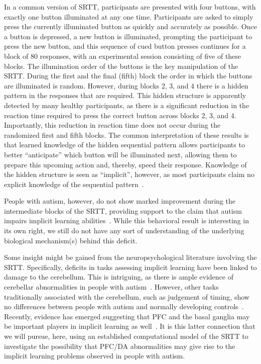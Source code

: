 In a common version of SRTT, participants are presented with four buttons, with exactly one button illuminated at any one time.  Participants are asked to simply press the currently illuminated button as quickly and accurately as possible.  Once a button is depressed, a new button is illuminated, prompting the participant to press the new button, and this sequence of cued button presses continues for a block of 80 responses, with an experimental session consisting of five of these blocks.  The illumination order of the buttons is the key manipulation of the SRTT.  During the first and the final (fifth) block the order in which the buttons are illuminated is random.  However, during blocks 2, 3, and 4 there is a hidden pattern in the responses that are required.  This hidden structure is apparently detected by many healthy participants, as there is a significant reduction in the reaction time required to press the correct button across blocks 2, 3, and 4.  Importantly, this reduction in reaction time does not occur during the randomized first and fifth blocks.  The common interpretation of these results is that learned knowledge of the hidden sequential pattern allows participants to better ``anticipate'' which button will be illuminated next, allowing them to prepare this upcoming action and, thereby, speed their response.  Knowledge of the hidden structure is seen as ``implicit'', however, as most participants claim no explicit knowledge of the sequential pattern~\cite{Cleeremans:1991:SSRT}.

People with autism, however, do not show marked improvement during the intermediate blocks of the SRTT, providing support to the claim that autism impairs implicit learning abilities~\cite{RefWorks:148}.  While this behavioral result is interesting in its own right, we still do not have any sort of understanding of the underlying biological mechanism(s) behind this deficit.

Some insight might be gained from the neuropsychological literature involving the SRTT.  Specifically, deficits in tasks assessing implicit learning have been linked to damage to the cerebellum.  This is intriguing, as there is ample evidence of cerebellar abnormalities in people with autism~\cite{CourchesneE:1994:CerebellumAttentionShift}.  However, other tasks traditionally associated with the cerebellum, such as judgement of timing, show no differences between people with autism and normally developing controls~\cite{RefWorks:148}.  Recently, evidence has emerged suggesting that PFC and the basal ganglia may be important players in implicit learning as well~\cite{RefWorks:109,PascualLeone:2004:PFC_Implicit}.  It is this latter connection that we will pursue, here, using an established computational model of the SRTT to investigate the possibility that PFC/DA abnormalities may give rise to the implicit learning problems observed in people with autism.

